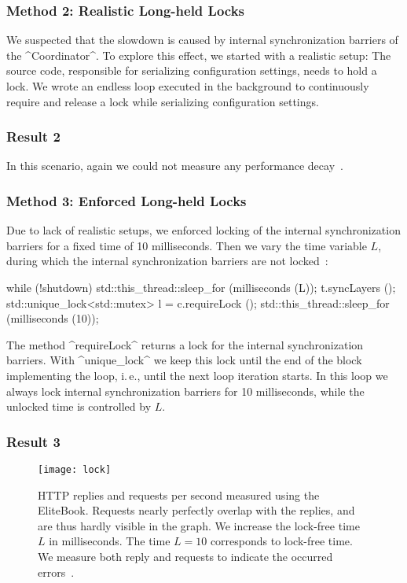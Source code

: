 \subsubsection{Method 2: Realistic Long-held Locks}

We suspected that the slowdown is caused by internal synchronization barriers of the ^Coordinator^.
To explore this effect, we started with a realistic setup:
The source code, responsible for serializing configuration settings, needs to hold a lock.
We wrote an endless loop executed in the background to continuously require and release a lock while serializing configuration settings.

\subsubsection{Result 2}

In this scenario, again we could not measure any performance decay~\cite{raab2015global}.

\subsubsection{Method 3: Enforced Long-held Locks}

Due to lack of realistic setups, we enforced locking of the internal synchronization barriers for a fixed time of 10 milliseconds.
Then we vary the time variable $L$, during which the internal synchronization barriers are not locked~\cite{raab2015global}:


\begin{code}[language=Cpp]
while (!shutdown)
{
	std::this_thread::sleep_for (milliseconds (L));
	t.syncLayers ();
	std::unique_lock<std::mutex> l = c.requireLock ();
	std::this_thread::sleep_for (milliseconds (10));
}
\end{code}

The method ^requireLock^ returns a lock for the internal synchronization barriers.
With ^unique_lock^ we keep this lock until the end of the block implementing the loop, i.\,e., until the next loop iteration starts.
In this loop we always lock internal synchronization barriers for 10 milliseconds, while the unlocked time is controlled by $L$.


\subsubsection{Result 3}

\begin{figure}[htp]
\centering
\texttt{[image: lock]}
\caption[EliteBook: HTTP requests and replies.]{HTTP replies and requests per second measured using the EliteBook.
Requests nearly perfectly overlap with the replies, and are thus hardly visible in the graph.
We increase the lock-free time $L$ in milliseconds.
The time $L=10$ corresponds to  lock-free time.
We measure both reply and requests to indicate the occurred errors~\cite{raab2015global}.}
\label{fig:lock}
\end{figure}

